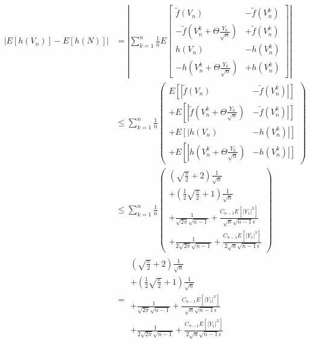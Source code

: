 \begin{align*}
\left|E[h(V_n)] - E[h(N)]\right| &= \left|\sum_{k=1}^n \frac 1n E \left[\begin{array}{ll} \tilde f(V_n) &-\tilde f\left(V_n^k\right)\\[0.3em]
-\tilde f\left(V_n^k +\Theta \frac{Y_k}{\sqrt n}\right) &+ \tilde f\left(V_n^k\right)\\[0.3em]
h(V_n)& - h\left(V_n^k\right) \\[0.3em]
 -h\left(V_n^k +\Theta \frac{Y_k}{\sqrt n}\right) & + h\left(V_n^k\right) \end{array}\right] \right| \\[1em]
&\le \sum_{k=1}^n \frac 1n \left(\begin{array}{ll} E\left[\left|\tilde f(V_n)\right.\right.&\left.\left.-\tilde f\left(V_n^k\right)\right|\right]\\[0.3em]
+E\left[\left|\tilde f\left(V_n^k +\Theta \frac{Y_k}{\sqrt n}\right) \right.\right.&\left.\left.- \tilde f\left(V_n^k\right)\right|\right]\\[0.3em]
+E\left[\left|h(V_n) \right.\right.&\left.\left. - h\left(V_n^k\right)\right|\right]\\[0.3em]
+E\left[\left|h\left(V_n^k +\Theta \frac{Y_k}{\sqrt n}\right) \right.\right.&\left.\left. - h\left(V_n^k\right) \right|\right]\end{array}\right)  \\[1em]
&\le \sum_{k=1}^n \frac 1n \left(\begin{array}{l}
\left(\sqrt{\tfrac\pi2}+2\right)\frac1{\sqrt n}\\[0.3em]
+\left(\tfrac 12\sqrt{\tfrac \pi2}+1\right)\frac{1}{\sqrt n}\\[0.3em]
+\tfrac{1}{\sqrt{2\pi}\sqrt{n-1}}+\frac{C_{n-1}E[|Y_1|^3]}{\sqrt{n}\sqrt{n-1}\epsilon}\\[0.3em]
+\tfrac{1}{2\sqrt{2\pi}\sqrt{n-1}}+\frac{C_{n-1}E[|Y_1|^3]}{2\sqrt{n}\sqrt{n-1}\epsilon}
\end{array}  \right)\\[1em]
&= \begin{array}{l}
\left(\sqrt{\tfrac\pi2}+2\right)\frac1{\sqrt n}\\[0.3em]
+\left(\tfrac 12\sqrt{\tfrac \pi2}+1\right)\frac{1}{\sqrt n}\\[0.3em]
+\tfrac{1}{\sqrt{2\pi}\sqrt{n-1}}+\frac{C_{n-1}E[|Y_1|^3]}{\sqrt{n}\sqrt{n-1}\epsilon}\\[0.3em]
+\tfrac{1}{2\sqrt{2\pi}\sqrt{n-1}}+\frac{C_{n-1}E[|Y_1|^3]}{2\sqrt{n}\sqrt{n-1}\epsilon}\\[0.3em]

\end{array}
\end{align*}
